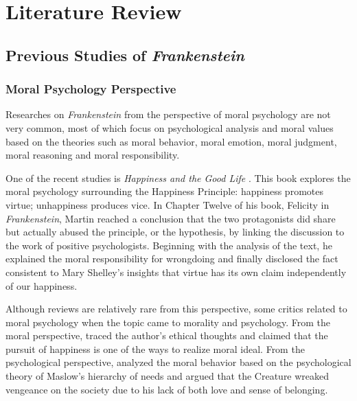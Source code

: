 \chapter{Literature Review} %
\label{cha:literature_review}
\section{Previous Studies of \textit{Frankenstein}} %
\label{sec:previous_studies_of_frankenstein}
\secspacesubsec
\subsection{Moral Psychology Perspective} %
\label{sub:moral_psychology_perspective}
\begin{text}

Researches on \textit{Frankenstein} from the perspective of moral psychology are not very common, most of which focus on psychological analysis and moral values based on the theories such as moral behavior, moral emotion, moral judgment, moral reasoning and moral responsibility.

One of the recent studies is \textit{Happiness and the Good Life} \citep{martin2012happiness}. This book explores the moral psychology surrounding the Happiness Principle: happiness promotes virtue; unhappiness produces vice. In Chapter Twelve of his book, Felicity in \textit{Frankenstein}, Martin reached a conclusion that the two protagonists did share but actually abused the principle, or the hypothesis, by linking the discussion to the work of positive psychologists. Beginning with the analysis of the text, he explained the moral responsibility for wrongdoing and finally disclosed the fact consistent to Mary Shelley's insights that virtue has its own claim independently of our happiness.

Although reviews are relatively rare from this perspective, some critics related to moral psychology when the topic came to morality and psychology. From the moral perspective,  traced the author's ethical thoughts and claimed that the pursuit of happiness is one of the ways to realize moral ideal. From the psychological perspective,  analyzed the moral behavior based on the psychological theory of Maslow's hierarchy of needs and argued that the Creature wreaked vengeance on the society due to his lack of both love and sense of belonging.

\end{text}
